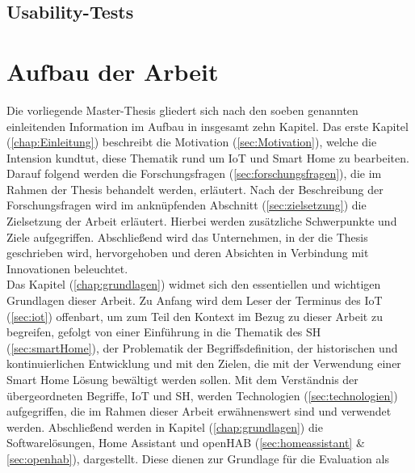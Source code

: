     \subsection{Usability-Tests}
    \label{subsec:usabilitytests}

\section{Aufbau der Arbeit}
\label{sec:aufbau}
    Die vorliegende Master-Thesis gliedert sich nach den soeben genannten einleitenden Information im Aufbau in insgesamt 
    zehn Kapitel. Das erste Kapitel (\ref{chap:Einleitung}) beschreibt die Motivation (\ref{sec:Motivation}), welche die 
    Intension kundtut, diese Thematik rund um \acs{IoT} und Smart Home zu bearbeiten. Darauf folgend werden die 
    Forschungsfragen (\ref{sec:forschungsfragen}), die im Rahmen der Thesis behandelt werden, erläutert. Nach der 
    Beschreibung der Forschungsfragen wird im anknüpfenden Abschnitt (\ref{sec:zielsetzung}) die Zielsetzung der 
    Arbeit erläutert. Hierbei werden zusätzliche Schwerpunkte und Ziele aufgegriffen. Abschließend wird das Unternehmen, in der 
    die Thesis geschrieben wird, hervorgehoben und deren Absichten in Verbindung mit Innovationen beleuchtet. 
    \\
    \linebreak
    Das Kapitel (\ref{chap:grundlagen}) widmet sich den essentiellen und wichtigen Grundlagen dieser Arbeit. Zu Anfang wird dem 
    Leser der Terminus des \acl{IoT} (\ref{sec:iot}) offenbart, um zum Teil den Kontext im Bezug zu dieser Arbeit zu begreifen, 
    gefolgt von einer Einführung in die Thematik des \acl{SH} (\ref{sec:smartHome}), der Problematik der Begriffsdefinition, der 
    historischen und kontinuierlichen Entwicklung und mit den Zielen, die mit der Verwendung einer Smart Home Lösung bewältigt 
    werden sollen. Mit dem Verständnis der übergeordneten Begriffe, \acs{IoT} und \acl{SH}, werden Technologien 
    (\ref{sec:technologien}) aufgegriffen, die im Rahmen dieser Arbeit erwähnenswert sind und verwendet werden. %
    Abschließend werden in Kapitel (\ref{chap:grundlagen}) die Softwarelösungen, Home Assistant 
    und openHAB (\ref{sec:homeassistant} \& \ref{sec:openhab}), dargestellt. Diese dienen zur Grundlage für die Evaluation als 
